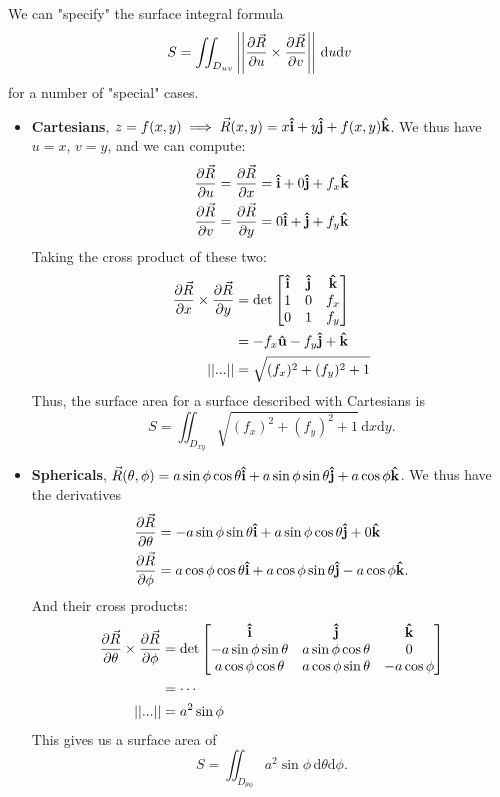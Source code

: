 \documentclass[12pt]{article}
\begin{document}
{We can "specify" the surface integral formula \[S = \iint_{D_{uv}} \left|\left| \frac{\partial \vec{R}}{\partial u} \times \frac{\partial \vec{R}}{\partial v}\right|\right| \, \text{d}u\text{d}v\] for a number of "special" cases.

\begin{itemize}
    \item \textbf{Cartesians}, $z = f(x,y) \implies \vec{R}(x,y) = x \vu{i} + y\vu{j} + f(x,y) \vu{k}$. We thus have $u = x, \, v = y$, and we can compute: \begin{align*}
        \frac{\partial \vec{R}}{\partial u} = \frac{\partial \vec{R}}{\partial x} &= \vu{i} + 0\vu{j} + f_x\vu{k}\\
        \frac{\partial \vec{R}}{\partial v} =\frac{\partial \vec{R}}{\partial y}&= 0\vu{i} + \vu{j} + f_y\vu{k}
    \end{align*}
    Taking the cross product of these two: 
    \begin{align*} \frac{\partial \vec{R}}{\partial x} \times \frac{\partial \vec{R}}{\partial y}&= \det\begin{bmatrix}
        \vu{i} & \vu{j} & \vu{k}\\
        1 & 0 & f_x\\
        0 & 1 & f_y
    \end{bmatrix}\\
    &= - f_x \vu{u} - f_y \vu{j} + \vu{k}\\
    ||...|| &= \sqrt{(f_x)^2 + (f_y)^2 + 1}
\end{align*}
Thus, the surface area for a surface described with Cartesians is \[S = \iint_{D_{xy}} \sqrt{(f_x)^2 + (f_y)^2 + 1} \, \text{d}x\text{d}y.\]

\item \textbf{Sphericals}, $\vec{R}(\theta, \phi) = a \sin \phi \cos \theta \vu{i} + a \sin \phi \sin \theta \vu{j} + a \cos \phi \vu{k}$.
We thus have the derivatives \begin{align*}
    \frac{\partial \vec{R}}{\partial \theta} &= - a \sin\phi \sin\theta \vu{i} + a \sin\phi \cos\theta \vu{j} + 0 \vu{k}\\
    \frac{\partial \vec{R}}{\partial \phi} &= a \cos\phi \cos\theta \vu{i} + a \cos\phi \sin\theta \vu{j} - a \cos \phi\vu{k}.
\end{align*}
And their cross products: \begin{align*}
    \frac{\partial \vec{R}}{\partial \theta} \times \frac{\partial \vec{R}}{\partial \phi} &= \det \begin{bmatrix}
        \vu{i} & \vu{j} & \vu{k}\\
        - a \sin\phi \sin\theta & a \sin\phi \cos\theta & 0\\
        a \cos\phi \cos\theta & a \cos\phi \sin\theta & - a \cos \phi
    \end{bmatrix}\\ 
    &= \cdots\\
    ||...|| &= a^2 \sin \phi
\end{align*}
This gives us a surface area of \[S = \iint_{D_{\theta\phi}} a^2 \sin \phi \, \text{d}\theta\text{d}\phi.\]


\end{itemize}}
\end{document}
